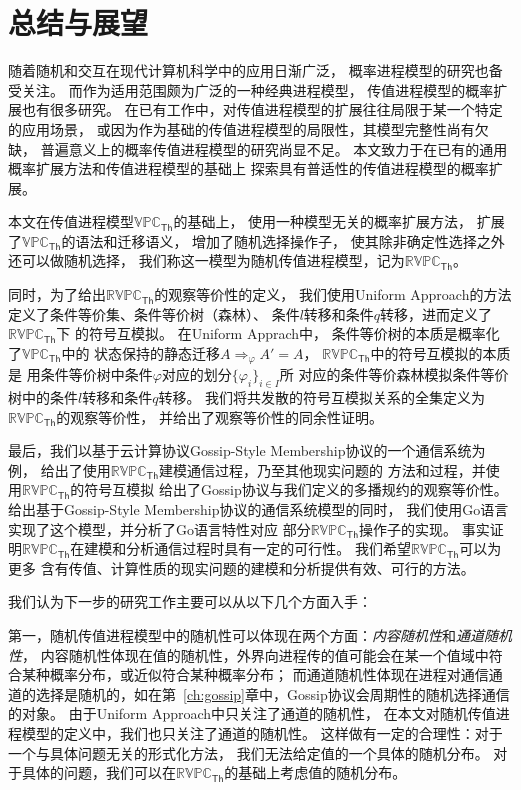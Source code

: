 \chapter{总结与展望}

随着随机和交互在现代计算机科学中的应用日渐广泛，
概率进程模型的研究也备受关注。
而作为适用范围颇为广泛的一种经典进程模型，
传值进程模型的概率扩展也有很多研究。
在已有工作中，对传值进程模型的扩展往往局限于某一个特定的应用场景，
或因为作为基础的传值进程模型的局限性，其模型完整性尚有欠缺，
普遍意义上的概率传值进程模型的研究尚显不足。
本文致力于在已有的通用概率扩展方法和传值进程模型的基础上
探索具有普适性的传值进程模型的概率扩展。

本文在传值进程模型$\mathbb{VPC}_{\mathsf{Th}}$的基础上，
使用一种模型无关的概率扩展方法，
扩展了$\mathbb{VPC}_{\mathsf{Th}}$的语法和迁移语义，
增加了随机选择操作子，
使其除非确定性选择之外还可以做随机选择，
我们称这一模型为随机传值进程模型，记为$\mathbb{RVPC}_{\mathsf{Th}}$。

同时，为了给出$\mathbb{RVPC}_{\mathsf{Th}}$的观察等价性的定义，
我们使用Uniform Approach的方法定义了条件等价集、条件等价树（森林）、
条件$l$转移和条件$q$转移，进而定义了$\mathbb{RVPC}_{\mathsf{Th}}$下
的符号互模拟。
在Uniform Apprach中，
条件等价树的本质是概率化了$\mathbb{VPC}_{\mathsf{Th}}$中的
状态保持的静态迁移$A\Rightarrow_{\varphi}A'=A$，
$\mathbb{RVPC}_{\mathsf{Th}}$中的符号互模拟的本质是
用条件等价树中条件$\varphi$对应的划分$\{\varphi_i\}_{i\in I}$所
对应的条件等价森林模拟条件等价树中的条件$l$转移和条件$q$转移。
我们将共发散的符号互模拟关系的全集定义为$\mathbb{RVPC}_{\mathsf{Th}}$的观察等价性，
并给出了观察等价性的同余性证明。

最后，我们以基于云计算协议Gossip-Style Membership协议的一个通信系统为例，
给出了使用$\mathbb{RVPC}_{\mathsf{Th}}$建模通信过程，乃至其他现实问题的
方法和过程，并使用$\mathbb{RVPC}_{\mathsf{Th}}$的符号互模拟
给出了Gossip协议与我们定义的多播规约的观察等价性。
给出基于Gossip-Style Membership协议的通信系统模型的同时，
我们使用Go语言实现了这个模型，并分析了Go语言特性对应
部分$\mathbb{RVPC}_{\mathsf{Th}}$操作子的实现。
事实证明$\mathbb{RVPC}_{\mathsf{Th}}$在建模和分析通信过程时具有一定的可行性。
我们希望$\mathbb{RVPC}_{\mathsf{Th}}$可以为更多
含有传值、计算性质的现实问题的建模和分析提供有效、可行的方法。

我们认为下一步的研究工作主要可以从以下几个方面入手：

第一，随机传值进程模型中的随机性可以体现在两个方面：\textit{内容随机性}和\textit{通道随机性}，
内容随机性体现在值的随机性，外界向进程传的值可能会在某一个值域中符合某种概率分布，或近似符合某种概率分布；
而通道随机性体现在进程对通信通道的选择是随机的，如在第~\ref{ch:gossip}章中，Gossip协议会周期性的随机选择通信的对象。
由于Uniform Approach中只关注了通道的随机性，
在本文对随机传值进程模型的定义中，我们也只关注了通道的随机性。
这样做有一定的合理性：对于一个与具体问题无关的形式化方法，
我们无法给定值的一个具体的随机分布。
对于具体的问题，我们可以在$\mathbb{RVPC}_{\mathsf{Th}}$的基础上考虑值的随机分布。

